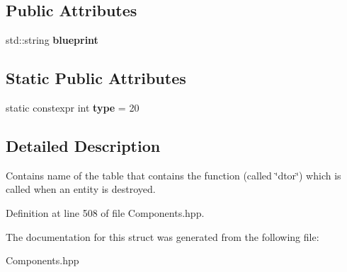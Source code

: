 \subsection*{Public Attributes}
\begin{DoxyCompactItemize}
\item 
std\+::string {\bfseries blueprint}\hypertarget{struct_destructor_component_a08739ab1287c35b9c53bcc0072d4baf9}{}\label{struct_destructor_component_a08739ab1287c35b9c53bcc0072d4baf9}

\end{DoxyCompactItemize}
\subsection*{Static Public Attributes}
\begin{DoxyCompactItemize}
\item 
static constexpr int {\bfseries type} = 20\hypertarget{struct_destructor_component_a1c3196707ec5bd820a3d72bd0555c1c7}{}\label{struct_destructor_component_a1c3196707ec5bd820a3d72bd0555c1c7}

\end{DoxyCompactItemize}


\subsection{Detailed Description}
Contains name of the table that contains the function (called \char`\"{}dtor\char`\"{}) which is called when an entity is destroyed. 

Definition at line 508 of file Components.\+hpp.



The documentation for this struct was generated from the following file\+:\begin{DoxyCompactItemize}
\item 
Components.\+hpp\end{DoxyCompactItemize}
